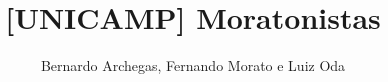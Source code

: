 \documentclass[12pt, a4paper, twoside]{article}
\title{[UNICAMP] Moratonistas}
\author{Bernardo Archegas, Fernando Morato e Luiz Oda}
\begin{document}
\twocolumn
\date{} %
\maketitle


\renewcommand{\contentsname}{Índice} %
\tableofcontents
\end{document}
